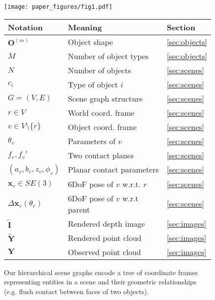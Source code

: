 \begin{figure}[t]
	\centering
    \begin{minipage}{0.6\textwidth}
	\texttt{[image: paper\_figures/fig1.pdf]}
    \end{minipage}%
    \begin{minipage}{0.4\textwidth}
    	\tiny
    \begin{tabular}{l|l|l}
Notation & Meaning & Section\\
\hline
$\mathbf{O}^{(m)}$ & Object shape & \ref{sec:objects}\\
$M$ & Number of object types & \ref{sec:objects}\\
$N$ & Number of objects & \ref{sec:scenes}\\
$c_i$ & Type of object $i$ & \ref{sec:scenes}\\
$G = (V, E)$ & Scene graph structure & \ref{sec:scenes}\\
$r \in V$ & World coord. frame & \ref{sec:scenes}\\
$v \in V \setminus \{r\}$ & Object coord. frame & \ref{sec:scenes}\\
$\theta_v$ & Parameters of $v$ & \ref{sec:scenes}\\
$f_v, f_v'$ & Two contact planes & \ref{sec:scenes}\\
$(a_v, b_v, z_v, \phi_v)$ & Planar contact parameters & \ref{sec:scenes}\\
$\mathbf{x}_v \in SE(3)$ & 6DoF pose of $v$ w.r.t. $r$ & \ref{sec:scenes}\\
$\Delta \mathbf{x}_v(\theta_v)$ & 6DoF pose of $v$ w.r.t parent & \ref{sec:scenes}\\
$\tilde{\mathbf{I}}$ & Rendered depth image & \ref{sec:images}\\
$\tilde{\mathbf{Y}}$ & Rendered point cloud & \ref{sec:images}\\
$\mathbf{Y}$ & Observed point cloud & \ref{sec:images}
    \end{tabular}
    \end{minipage}%
	\caption{Our hierarchical scene graphs encode a tree of coordinate frames representing entities in a scene and their geometric relationships (e.g. flush contact between faces of two objects).}
	\label{fig:scene-graph}
\end{figure}



